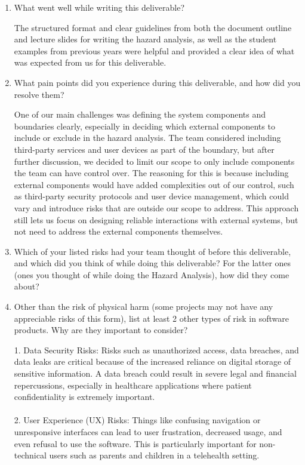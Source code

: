 \documentclass{article}
\begin{document}
\begin{enumerate}
    \item What went well while writing this deliverable? 
    
    The structured format and clear guidelines from both the document outline and lecture slides for writing the hazard 
    analysis, as well as the student examples from previous years were helpful and provided a clear idea of what was 
    expected from us for this deliverable.\\

    \item What pain points did you experience during this deliverable, and how
    did you resolve them?

    One of our main challenges was defining the system components and boundaries clearly, especially in deciding which 
    external components to include or exclude in the hazard analysis. The team considered including third-party services 
    and user devices as part of the boundary, but after further discussion, we decided to limit our scope to only include 
    components the team can have control over. The reasoning for this is because including external components would have 
    added complexities out of our control, such as third-party security protocols and user device management, which could 
    vary and introduce risks that are outside our scope to address. This approach still lets us focus on designing reliable 
    interactions with external systems, but not need to address the external components themselves.\\

    \item Which of your listed risks had your team thought of before this
    deliverable, and which did you think of while doing this deliverable? For
    the latter ones (ones you thought of while doing the Hazard Analysis), how
    did they come about?



    \item Other than the risk of physical harm (some projects may not have any
    appreciable risks of this form), list at least 2 other types of risk in
    software products. Why are they important to consider?

    1. Data Security Risks: Risks such as unauthorized access, data breaches, and data leaks are critical because of the 
    increased reliance on digital storage of sensitive information. A data breach could result in severe legal and 
    financial repercussions, especially in healthcare applications where patient confidentiality is extremely important. \\\\
	2. User Experience (UX) Risks: Things like confusing navigation or unresponsive interfaces can lead to user 
    frustration, decreased usage, and even refusal to use the software. This is particularly important for non-technical 
    users such as parents and children in a telehealth setting.

\end{enumerate}
\end{document}
